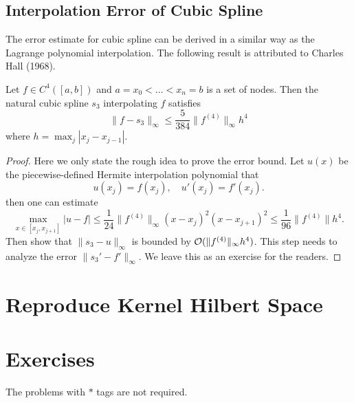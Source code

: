 \subsection{Interpolation Error of Cubic Spline}
The error estimate for cubic spline can be derived in a similar way as the Lagrange polynomial interpolation. The following result is attributed to Charles Hall (1968).
\begin{theorem}\label{THM: ERROR CUBIC SPLINE}
    Let $f\in C^4([a, b])$ and $a = x_0 < \dots < x_n = b$ is a set of nodes. Then the natural cubic spline $s_3$ interpolating $f$ satisfies 
    \begin{equation}
        \|f - s_3\|_{\infty} \le \frac{5}{384}\|f^{(4)}\|_{\infty} h^4
    \end{equation}
    where $h = \max_j |x_j - x_{j-1}|$.
\end{theorem}
\begin{proof}
    Here we only state the rough idea to prove the error bound. Let $u(x)$ be the piecewise-defined Hermite interpolation polynomial that 
    \begin{equation}
        u(x_j)=f(x_j), \quad u'(x_j) = f'(x_j).
    \end{equation}
    then one can estimate 
    \begin{equation}
        \max_{x\in [x_j, x_{j+1}]} |u-f|\le  \frac{1}{24}\|f^{(4)}\|_{\infty} (x - x_j)^2 (x - x_{j+1})^2 \le \frac{1}{96}\|f^{(4)}\| h^4.
    \end{equation}
    Then show that $\|s_3 - u\|_{\infty}$ is bounded by $\mathcal O(\|f^{(4)}\|_{\infty} h^4)$. This step needs to analyze the error $\|s_3' - f'\|_{\infty}$. We leave this as an exercise for the readers.
\end{proof}

\section{Reproduce Kernel Hilbert Space}


\section{Exercises}
The problems with $\ast$ tags are not required.
